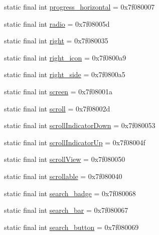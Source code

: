 \begin{CompactItemize}
static final int \hyperlink{classandroid_1_1support_1_1v7_1_1mediarouter_1_1_r_1_1id_a74236551439def093e0dc3758419be4}{progress\_\-horizontal} = 0x7f080007
\item 
static final int \hyperlink{classandroid_1_1support_1_1v7_1_1mediarouter_1_1_r_1_1id_8e4cdbb07e0b7dd3cb6a3720120db2c9}{radio} = 0x7f08005d
\item 
static final int \hyperlink{classandroid_1_1support_1_1v7_1_1mediarouter_1_1_r_1_1id_cb40a25faad91aa9b420e7487371ec40}{right} = 0x7f080035
\item 
static final int \hyperlink{classandroid_1_1support_1_1v7_1_1mediarouter_1_1_r_1_1id_a3632596b1ae9ea99e0483e52d6cc229}{right\_\-icon} = 0x7f0800a9
\item 
static final int \hyperlink{classandroid_1_1support_1_1v7_1_1mediarouter_1_1_r_1_1id_8796fd233270d24e7631aacc6b0c7b42}{right\_\-side} = 0x7f0800a5
\item 
static final int \hyperlink{classandroid_1_1support_1_1v7_1_1mediarouter_1_1_r_1_1id_eb30ae39bdee42021a6ccc4ceee72e62}{screen} = 0x7f08001a
\item 
static final int \hyperlink{classandroid_1_1support_1_1v7_1_1mediarouter_1_1_r_1_1id_648b6eafbb33cfd42504c7ea49a44d3a}{scroll} = 0x7f08002d
\item 
static final int \hyperlink{classandroid_1_1support_1_1v7_1_1mediarouter_1_1_r_1_1id_6622844d0d11e089aaf9ffc002eadb16}{scrollIndicatorDown} = 0x7f080053
\item 
static final int \hyperlink{classandroid_1_1support_1_1v7_1_1mediarouter_1_1_r_1_1id_f8f88e48af5084cb5e1a118b421c0357}{scrollIndicatorUp} = 0x7f08004f
\item 
static final int \hyperlink{classandroid_1_1support_1_1v7_1_1mediarouter_1_1_r_1_1id_9a304e0da789835df305a28c01211e39}{scrollView} = 0x7f080050
\item 
static final int \hyperlink{classandroid_1_1support_1_1v7_1_1mediarouter_1_1_r_1_1id_135b15f21873c2b4a73bc076d4477bde}{scrollable} = 0x7f080040
\item 
static final int \hyperlink{classandroid_1_1support_1_1v7_1_1mediarouter_1_1_r_1_1id_eaf4ff14bc84688312968ec161511380}{search\_\-badge} = 0x7f080068
\item 
static final int \hyperlink{classandroid_1_1support_1_1v7_1_1mediarouter_1_1_r_1_1id_e6b87a14fda66934b10a5c2d7067f2ac}{search\_\-bar} = 0x7f080067
\item 
static final int \hyperlink{classandroid_1_1support_1_1v7_1_1mediarouter_1_1_r_1_1id_19eef9b0a9a82df0e95714e50006dc74}{search\_\-button} = 0x7f080069

\end{CompactItemize}
